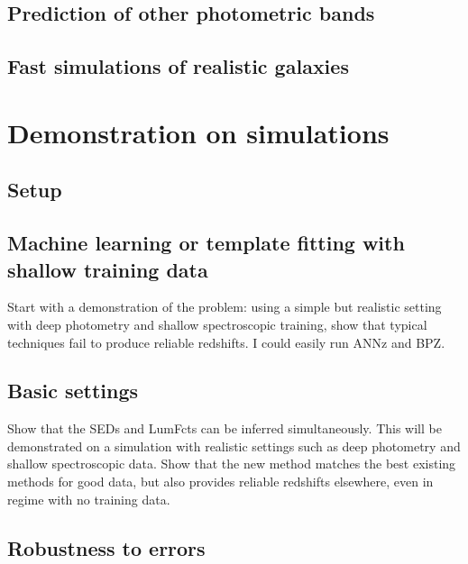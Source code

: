 \documentclass[aps,prd,showpacs,superscriptaddress,groupedaddress]{revtex4}  %
\begin{document}
\subsection{Prediction of other photometric bands}

\subsection{Fast simulations of realistic galaxies}


\section{Demonstration on simulations}

\subsection{Setup}

\subsection{Machine learning or template fitting with shallow training data}

Start with a demonstration of the problem: using a simple but realistic setting with deep photometry and shallow spectroscopic training, show that typical techniques fail to produce reliable redshifts. I could easily run ANNz and BPZ.


\subsection{Basic settings}

Show that the SEDs and LumFcts can be inferred simultaneously. This will be demonstrated on a simulation with realistic settings such as deep photometry and shallow spectroscopic data. 
Show that the new method matches the best existing methods for good data, but also provides reliable redshifts elsewhere, even in regime with no training data. 

\subsection{Robustness to errors}
\end{document}
